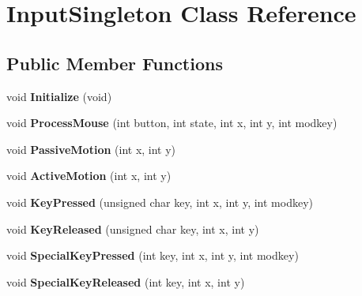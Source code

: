 \hypertarget{class_input_singleton}{}\section{Input\+Singleton Class Reference}
\label{class_input_singleton}
\subsection*{Public Member Functions}
\begin{DoxyCompactItemize}
\item 
\mbox{\label{class_input_singleton_accc1b8003b192596f5200624ed5a5475}} 
void {\bfseries Initialize} (void)
\item 
\mbox{\label{class_input_singleton_a85d79fb2cd71a0078d3c097a4de8be2f}} 
void {\bfseries Process\+Mouse} (int button, int state, int x, int y, int modkey)
\item 
\mbox{\label{class_input_singleton_a9a3d828de1f6c3a466582151dd8c0d2b}} 
void {\bfseries Passive\+Motion} (int x, int y)
\item 
\mbox{\label{class_input_singleton_a870ee08a550bd36d590066daa20a88da}} 
void {\bfseries Active\+Motion} (int x, int y)
\item 
\mbox{\label{class_input_singleton_a70b7de59f1db31cc8898b83b42c4aa12}} 
void {\bfseries Key\+Pressed} (unsigned char key, int x, int y, int modkey)
\item 
\mbox{\label{class_input_singleton_a984cdcc2bbd59e9888fdc8505ebc031c}} 
void {\bfseries Key\+Released} (unsigned char key, int x, int y)
\item 
\mbox{\label{class_input_singleton_a538a3871c978eed948d89df9c01ea9ea}} 
void {\bfseries Special\+Key\+Pressed} (int key, int x, int y, int modkey)
\item 
\mbox{\label{class_input_singleton_aff6d806e1f9f1896a4cda094c95741df}} 
void {\bfseries Special\+Key\+Released} (int key, int x, int y)
\end{DoxyCompactItemize}
